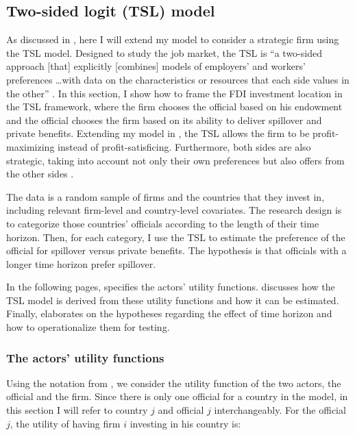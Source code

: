\subsection{Two-sided logit (TSL) model}
\label{sec:rd_tsl}

As discussed in , here I will extend my model to consider a strategic firm using the TSL model. Designed to study the job market, the TSL is ``a two-sided approach [that] explicitly [combines] models of employers' and workers' preferences \dots with data on the characteristics or resources that each side values in the other'' \citep[117]{Logan1996}. In this section, I show how to frame the FDI investment location in the TSL framework, where the firm chooses the official based on his endowment and the official chooses the firm based on its ability to deliver spillover and private benefits. Extending my model in , the TSL allows the firm to be profit-maximizing instead of profit-satisficing. Furthermore, both sides are also strategic, taking into account not only their own preferences but also offers from the other sides \citep{Logan1996a}.

The data is a random sample of firms and the countries that they invest in, including relevant firm-level and country-level covariates. The research design is to categorize those countries' officials according to the length of their time horizon. Then, for each category, I use the TSL to estimate the preference of the official for spillover versus private benefits. The hypothesis is that officials with a longer time horizon prefer spillover.

In the following pages,  specifies the actors' utility functions.  discusses how the TSL model is derived from these utility functions and how it can be estimated. Finally,  elaborates on the hypotheses regarding the effect of time horizon and how to operationalize them for testing.

\subsubsection{The actors' utility functions}
\label{sec:tsl_actor_utility}


Using the notation from \citet{Logan1998}, we consider the utility function of the two actors, the official and the firm. Since there is only one official for a country in the model, in this section I will refer to country $j$ and official $j$ interchangeably. For the official $j$, the utility of having firm $i$ investing in his country is:

